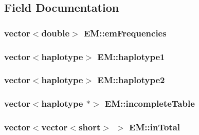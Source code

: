 \subsection{Field Documentation}
\hypertarget{classEM_ae76fe505f85355d362d5022436980331}{
\subsubsection[{emFrequencies}]{\setlength{\rightskip}{0pt plus 5cm}vector$<$double$>$ {\bf EM::emFrequencies}}}
\label{classEM_ae76fe505f85355d362d5022436980331}
\hypertarget{classEM_a4d771fc7aca0ee55ee0b8742269b54e7}{
\subsubsection[{haplotype1}]{\setlength{\rightskip}{0pt plus 5cm}vector$<${\bf haplotype}$>$ {\bf EM::haplotype1}}}
\label{classEM_a4d771fc7aca0ee55ee0b8742269b54e7}
\hypertarget{classEM_a7eb2fa8a9c6db4c1425d77298cec869d}{
\subsubsection[{haplotype2}]{\setlength{\rightskip}{0pt plus 5cm}vector$<${\bf haplotype}$>$ {\bf EM::haplotype2}}}
\label{classEM_a7eb2fa8a9c6db4c1425d77298cec869d}
\hypertarget{classEM_a16a75209aa892c812af91aaea1b41500}{
\subsubsection[{incompleteTable}]{\setlength{\rightskip}{0pt plus 5cm}vector$<${\bf haplotype} $\ast$$>$ {\bf EM::incompleteTable}}}
\label{classEM_a16a75209aa892c812af91aaea1b41500}
\hypertarget{classEM_a0a7a49feeff6a6ce2908bd626c876a60}{
\subsubsection[{inTotal}]{\setlength{\rightskip}{0pt plus 5cm}vector$<$vector$<$short$>$ $>$ {\bf EM::inTotal}}}
